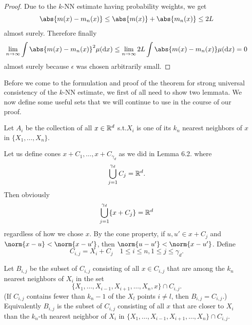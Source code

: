 \begin{proof}
    Due to the $k$-NN estimate having probability weights, we get
    \[
        \abs{m(x) - m_n(x)} \leq \abs{m(x)} + \abs{m_n(x)} \leq 2L
    \]
    almost surely.
    Therefore finally
    \begin{align*}
        \lim_{n \to \infty} \int \abs{m(x) - m_n(x)}^2 \mu(\dx)
        \leq \lim_{n \to \infty} 2L\int \abs{m(x) - m_n(x)} \mu(\dx)
        = 0
    \end{align*}
    almost surely because \(\epsilon\) was chosen arbitrarily small.
   
    
    
\end{proof}

Before we come to the formulation and proof of the theorem for strong universal consistency of the $k$-NN estimate, we first of all need to show two lemmata. We now define some useful sets that we will continue to use in the course of our proof.

\begin{definition} \label{knnai}
    Let \(A_i\) be the collection of all \(x \in \mathbb{R}^d\) s.t.\@ \(X_i\) is one of its \(k_n\) nearest neighbors of \(x\) in \(\{X_1, \ldots, X_n\}\).
\end{definition}

 Let us define cones \(x + C_1, \ldots, x + C_{\gamma_d}\) as we did in Lemma 6.2. where 
\begin{align*}
    \bigcup_{j=1}^{\gamma_d} C_j = \mathbb{R}^d.
\end{align*}
Then obviously
\begin{align} \label{cover}
    \bigcup_{j=1}^{\gamma_d} \{x + C_j\} = \mathbb{R}^d
\end{align}
regardless of how we chose \(x\). By the cone property, if \(u, u' \in x + C_j\) and \(\norm{x - u} < \norm{x - u'}\), then \(\norm{u - u'} < \norm{x - u'}\). Define
\[
    C_{i, j} = X_i + C_j \quad 1 \leq i \leq n, 1 \leq j \leq \gamma_d.
\]

\begin{definition} \label{knnbi}
    Let \(B_{i, j}\) be the subset of \(C_{i, j}\) consisting of all \(x \in C_{i, j}\) that are among the \(k_n\) nearest neighbors of \(X_i\) in the set
    \[
        \{X_1, \ldots, X_{i-1},X_{i+1}, \ldots, X_n, x\} \cap C_{i, j}. 
    \]
    (If \(C_{i, j}\) contains fewer than \(k_n-1\) of the \(X_l\) points \(i \neq l\), then \(B_{i, j} = C_{i, j}\).) Equivalently \(B_{i, j}\) is the subset of \(C_{i, j}\) consisting of all \(x\) that are closer to \(X_i\) than the \(k_n\)-th nearest neighbor of \(X_i\) in \(\{X_1, \ldots, X_{i-1}, X_{i+1}, \ldots, X_n\} \cap C_{i, j}\).
    
\end{definition}

